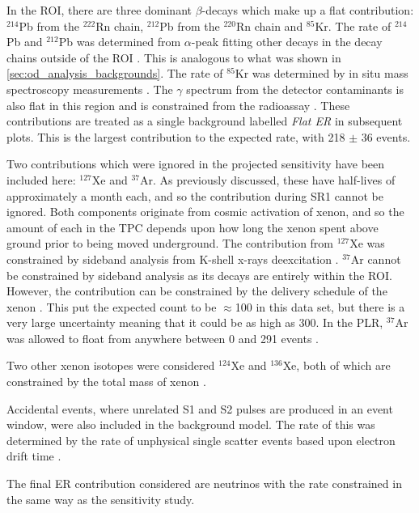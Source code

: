 \par
In the ROI, there are three dominant $\beta$-decays which make up a flat contribution: ${}^{214}$Pb from the ${}^{222}$Rn chain, ${}^{212}$Pb from the ${}^{220}$Rn chain and ${}^{85}$Kr.
The rate of ${}^{214}$Pb and ${}^{212}$Pb was determined from $\alpha$-peak fitting other decays in the decay chains outside of the ROI \cite{lz_sr1_backgrounds_ref}.
This is analogous to what was shown in \autoref{sec:od_analysis_backgrounds}.
The rate of ${}^{85}$Kr was determined by in situ mass spectroscopy measurements \cite{lz_sr1_backgrounds_ref}. 
The $\gamma$ spectrum from the detector contaminants is also flat in this region and is constrained from the radioassay \cite{LZ_assay_ref}.
These contributions are treated as a single background labelled \textit{Flat ER} in subsequent plots.
This is the largest contribution to the expected rate, with 218 $\pm$ 36 events.
\par
Two contributions which were ignored in the projected sensitivity have been included here: ${}^{127}$Xe and ${}^{37}$Ar.
As previously discussed, these have half-lives of approximately a month each, and so the contribution during SR1 cannot be ignored.
Both components originate from cosmic activation of xenon, and so the amount of each in the TPC depends upon how long the xenon spent above ground prior to being moved underground.
The contribution from $^{127}$Xe was constrained by sideband analysis from K-shell x-rays deexcitation \cite{marisarthurs_thesis_ref}.
${}^{37}$Ar cannot be constrained by sideband analysis as its decays are entirely within the ROI.
However, the contribution can be constrained by the delivery schedule of the xenon \cite{lz_argon37_ref}.
This put the expected count to be $\approx$100 in this data set, but there is a very large uncertainty meaning that it could be as high as 300.
In the PLR, ${}^{37}$Ar was allowed to float from anywhere between 0 and 291 events \cite{lz_argon37_ref}.
\par
Two other xenon isotopes were considered ${}^{124}$Xe and ${}^{136}$Xe, both of which are constrained by the total mass of xenon \cite{lz_ws_sr1_ref}.
\par
Accidental events, where unrelated S1 and S2 pulses are produced in an event window, were also included in the background model.
The rate of this was determined by the rate of unphysical single scatter events based upon electron drift time \cite{lz_ws_sr1_ref}.
\par
The final ER contribution considered are neutrinos with the rate constrained in the same way as the sensitivity study.
